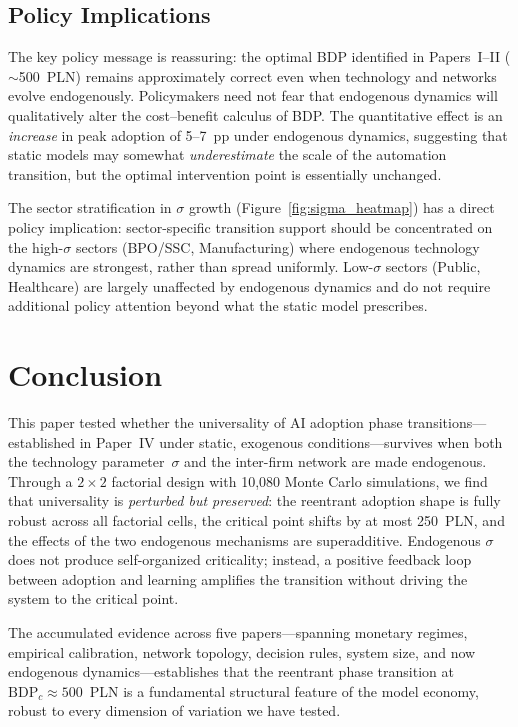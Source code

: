 \documentclass[12pt,a4paper]{article}
\begin{document}
\subsection{Policy Implications}\label{sec:policy}

The key policy message is reassuring: the optimal BDP identified in
Papers~I--II ($\sim$500~PLN) remains approximately correct even when
technology and networks evolve endogenously. Policymakers need not
fear that endogenous dynamics will qualitatively alter the
cost--benefit calculus of BDP. The quantitative effect is an
\emph{increase} in peak adoption of 5--7~pp under endogenous
dynamics, suggesting that static models may somewhat \emph{underestimate}
the scale of the automation transition, but the optimal intervention
point is essentially unchanged.

The sector stratification in $\sigma$ growth (Figure~\ref{fig:sigma_heatmap})
has a direct policy implication: sector-specific transition support
should be concentrated on the high-$\sigma$ sectors (BPO/SSC,
Manufacturing) where endogenous technology dynamics are strongest,
rather than spread uniformly. Low-$\sigma$ sectors (Public, Healthcare)
are largely unaffected by endogenous dynamics and do not require
additional policy attention beyond what the static model prescribes.


\section{Conclusion}\label{sec:conclusion}

This paper tested whether the universality of AI adoption phase
transitions---established in Paper~IV under static, exogenous
conditions---survives when both the technology parameter~$\sigma$
and the inter-firm network are made endogenous. Through a $2 \times 2$
factorial design with 10,080 Monte Carlo simulations, we find that
universality is \emph{perturbed but preserved}: the reentrant adoption
shape is fully robust across all factorial cells, the critical point
shifts by at most 250~PLN, and the effects of the two endogenous
mechanisms are superadditive. Endogenous $\sigma$ does not produce
self-organized criticality; instead, a positive feedback loop between
adoption and learning amplifies the transition without driving the
system to the critical point.

The accumulated evidence across five papers---spanning monetary regimes,
empirical calibration, network topology, decision rules, system size,
and now endogenous dynamics---establishes that the reentrant phase
transition at $\mathrm{BDP}_c \approx 500$~PLN is a fundamental
structural feature of the model economy, robust to every dimension
of variation we have tested.


\printbibliography
\end{document}
